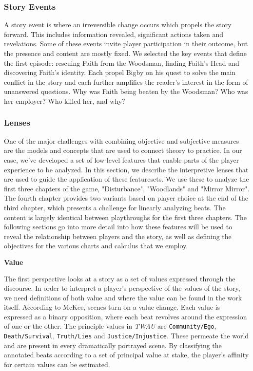 \subsubsection{Story Events}
\label{sec:org2b632ee}
A story event is where an irreversible change occurs which propels the
story forward. This includes information revealed, significant actions
taken and revelations. Some of these events invite player
participation in their outcome, but the presence and content are
mostly fixed. We selected the key events that define the first
episode: rescuing Faith from the Woodsman, finding Faith's Head and
discovering Faith's identity. Each propel Bigby on his quest to solve
the main conflict in the story and each further amplifies the reader's
interest in the form of unanswered questions. Why was Faith being
beaten by the Woodsman? Who was her employer? Who killed her, and why?

\subsubsection{Lenses}
\label{sec:org5cffab0}
One of the major challenges with combining objective and subjective
measures are the models and concepts that are used to connect theory
to practice. In our case, we've developed a set of low-level features
that enable parts of the player experience to be analyzed. In this
section, we describe the interpretive lenses that are used to guide
the application of these featuresets. We use these to analyze the
first three chapters of the game, "Disturbance", "Woodlands" and
"Mirror Mirror". The fourth chapter provides two variants based on
player choice at the end of the third chapter, which presents a
challenge for linearly analyzing beats. The content is largely
identical between playthroughs for the first three chapters. The
following sections go into more detail into how these features will be
used to reveal the relationship between players and the story, as well
as defining the objectives for the various charts and calculus that we
employ.

\textbf{Value}

The first perspective looks at a story as a set of values expressed
through the discourse. In order to interpret a player's perspective of
the values of the story, we need definitions of both value and where
the value can be found in the work itself. According to McKee, scenes
turn on a value change. Each value is expressed as a binary
opposition, where each beat revolves around the expression of one or
the other. The principle values in \emph{TWAU} are \texttt{Community/Ego},
\texttt{Death/Survival}, \texttt{Truth/Lies} and \texttt{Justice/Injustice}. These permeate
the world and are present in every dramatically portrayed scene. By
classifying the annotated beats according to a set of principal value
at stake, the player's affinity for certain values can be estimated.

